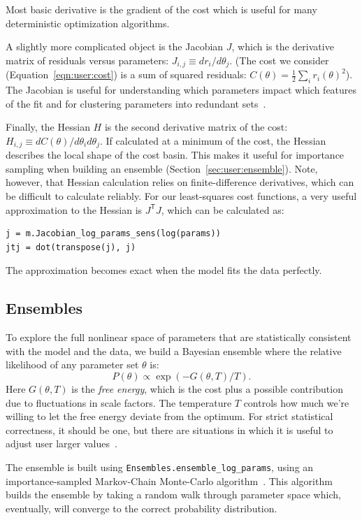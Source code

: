 \documentclass[12pt]{article}
\makeatletter
\newcommand{\transpose}[1]{\ensuremath{{#1}^\mathsf{T}}}
\newcommand{\JtJ}{\ensuremath{\transpose{J}\!J}\xspace}
\newcommand{\py}[1]{\lstinline[language=Python, showstringspaces=False]@#1@}
\makeatother
\begin{document}
Most basic derivative is the gradient of the cost which is useful for many deterministic optimization algorithms.

A slightly more complicated object is the Jacobian $J$, which is the derivative matrix of residuals versus parameters: $J_{i,j} \equiv d r_i/d \theta_j$. (The cost we consider (Equation~\ref{eqn:user:cost}) is a sum of squared residuals: $C(\theta) = \frac{1}{2} \sum_i r_i(\theta)^2$).
The Jacobian is useful for understanding which parameters impact which features of the fit and for clustering parameters into redundant sets~\cite{bib:WaterfallPhD}.

Finally, the Hessian $H$ is the second derivative matrix of the cost: $H_{i,j} \equiv d C(\theta)/d \theta_i d\theta_j$.
If calculated at a minimum of the cost, the Hessian describes the local shape of the cost basin.
This makes it useful for importance sampling when building an ensemble (Section~\ref{sec:user:ensemble}).
Note, however, that Hessian calculation relies on finite-difference derivatives, which can be difficult to calculate reliably.
For our least-squares cost functions, a very useful approximation to the Hessian is \JtJ, which can be calculated as:
\begin{lstlisting}
j = m.Jacobian_log_params_sens(log(params))
jtj = dot(transpose(j), j)   
\end{lstlisting}
The approximation becomes exact when the model fits the data perfectly.

\subsection{Ensembles\label{sec:user:ensemble}}

To explore the full nonlinear space of parameters that are statistically consistent with the model and the data, we build a Bayesian ensemble where the relative likelihood of any parameter set $\theta$ is:
\begin{equation}
P(\theta) \propto \exp\left(-G(\theta, T)/T\right).
\end{equation}
Here $G(\theta, T)$ is the \emph{free energy}, which is the cost plus a possible contribution due to fluctuations in scale factors.
The temperature $T$ controls how much we're willing to let the free energy deviate from the optimum.
For strict statistical correctness, it should be one, but there are situations in which it is useful to adjust user larger values~\cite{bib:Frederiksen2004}.

The ensemble is built using \py{Ensembles.ensemble_log_params}, using an importance-sampled Markov-Chain Monte-Carlo algorithm~\cite{bib:Chib1995}.
This algorithm builds the ensemble by taking a random walk through parameter space which, eventually, will converge to the correct probability distribution.
\end{document}
